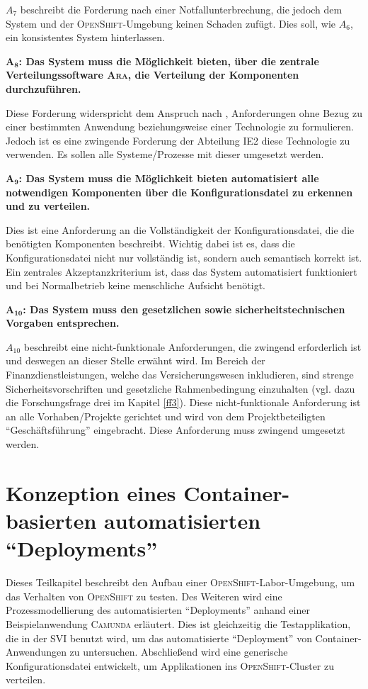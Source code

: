 $A_{7}$ beschreibt die Forderung nach einer Notfallunterbrechung, die jedoch dem System und der \textsc{OpenShift}-Umgebung keinen Schaden zufügt. Dies soll, wie $A_{6}$, ein konsistentes System hinterlassen. 
\par
$\mathbf{A_{8}}$\textbf{: Das System muss die Möglichkeit bieten, über die zentrale Verteilungssoftware \textsc{Ara}, die Verteilung der Komponenten durchzuführen.}
\par
Diese Forderung widerspricht dem Anspruch nach \cite{hull_requirements_2011}, Anforderungen ohne Bezug zu einer bestimmten Anwendung beziehungsweise einer Technologie zu formulieren. Jedoch ist es eine zwingende Forderung der Abteilung \ac{IE2} diese Technologie zu verwenden. Es sollen alle Systeme/Prozesse mit dieser umgesetzt werden.
\par
$\mathbf{A_{9}}$\textbf{: Das System muss die Möglichkeit bieten automatisiert alle notwendigen Komponenten über die Konfigurationsdatei zu erkennen und zu verteilen.}
\par
Dies ist eine Anforderung an die Vollständigkeit der Konfigurationsdatei, die die benötigten Komponenten beschreibt. Wichtig dabei ist es, dass die Konfigurationsdatei nicht nur vollständig ist, sondern auch semantisch korrekt ist. Ein zentrales Akzeptanzkriterium ist, dass das System automatisiert funktioniert und bei Normalbetrieb keine menschliche Aufsicht benötigt.
\par
$\mathbf{A_{10}}$\textbf{: Das System muss den gesetzlichen sowie sicherheitstechnischen Vorgaben entsprechen.}
\par
$A_{10}$ beschreibt eine nicht-funktionale Anforderungen, die zwingend erforderlich ist und deswegen an dieser Stelle erwähnt wird. Im Bereich der Finanzdienstleistungen, welche das Versicherungswesen inkludieren, sind strenge Sicherheitsvorschriften und gesetzliche Rahmenbedingung einzuhalten (vgl. dazu die Forschungsfrage drei im Kapitel \vref{ff3}). Diese nicht-funktionale Anforderung ist an alle Vorhaben/Projekte gerichtet und wird von dem Projektbeteiligten \enquote{Geschäftsführung} eingebracht. Diese Anforderung muss zwingend umgesetzt werden. 

\section{Konzeption eines Container-basierten automatisierten \enquote{Deployments}}
Dieses Teilkapitel beschreibt den Aufbau einer \textsc{OpenShift}-Labor-Umgebung, um das Verhalten von \textsc{OpenShift} zu testen. Des Weiteren wird eine Prozessmodellierung des automatisierten \enquote{Deployments} anhand einer Beispielanwendung \textsc{Camunda} erläutert. Dies ist gleichzeitig die Testapplikation, die in der \ac{SVI} benutzt wird, um das automatisierte \enquote{Deployment} von Container-Anwendungen zu untersuchen. Abschließend wird eine generische Konfigurationsdatei entwickelt, um Applikationen ins \textsc{OpenShift}-Cluster zu verteilen.

